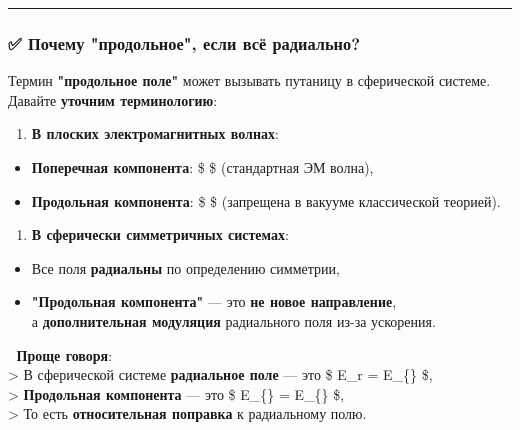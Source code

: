 \documentclass[11pt]{article}
\providecommand{\tightlist}{%
      \setlength{\itemsep}{0pt}\setlength{\parskip}{0pt}}
\begin{document}
\begin{center}\rule{0.5\linewidth}{\linethickness}\end{center}

\subsubsection{✅ Почему "продольное", если всё
радиально?}\label{ux43fux43eux447ux435ux43cux443-ux43fux440ux43eux434ux43eux43bux44cux43dux43eux435-ux435ux441ux43bux438-ux432ux441ux451-ux440ux430ux434ux438ux430ux43bux44cux43dux43e}

Термин \textbf{"продольное поле"} может вызывать путаницу в сферической
системе.\\
Давайте \textbf{уточним терминологию}:

\begin{enumerate}
\def\labelenumi{\arabic{enumi}.}
\tightlist
\item
  \textbf{В плоских электромагнитных волнах}:
\end{enumerate}

\begin{itemize}
\tightlist
\item
  \textbf{Поперечная компонента}: \$  \perp {} \$
  (стандартная ЭМ волна),
\item
  \textbf{Продольная компонента}: \$  \parallel {} \$
  (запрещена в вакууме классической теорией).
\end{itemize}

\begin{enumerate}
\def\labelenumi{\arabic{enumi}.}
\setcounter{enumi}{1}
\tightlist
\item
  \textbf{В сферически симметричных системах}:
\end{enumerate}

\begin{itemize}
\tightlist
\item
  Все поля \textbf{радиальны} по определению симметрии,
\item
  \textbf{"Продольная компонента"} --- это \textbf{не новое
  направление},\\
  а \textbf{дополнительная модуляция} радиального поля из-за ускорения.
\end{itemize}

📌 \textbf{Проще говоря}:\\
\textgreater{} В сферической системе \textbf{радиальное поле} --- это \$
E\_r = E\_\{\} \$,\\
\textgreater{} \textbf{Продольная компонента} --- это \$
E\_\{\parallel\} =  E\_\{\} \$,\\
\textgreater{} То есть \textbf{относительная поправка} к радиальному
полю.
\end{document}
